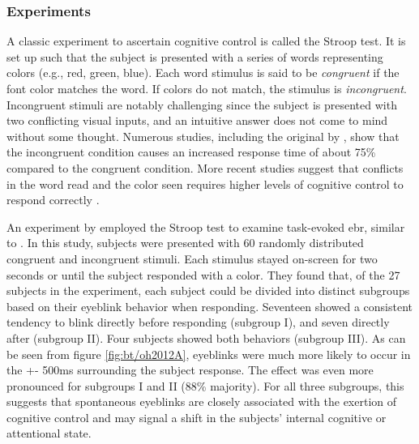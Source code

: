 
\subsubsection{Experiments}

A classic experiment to ascertain cognitive control is called the Stroop test. It is set up such that the subject is presented with a series of words representing colors (e.g., red, green, blue). Each word stimulus is said to be \textit{congruent} if the font color matches the word. If colors do not match, the stimulus is \textit{incongruent}. Incongruent stimuli are notably challenging since the subject is presented with two conflicting visual inputs, and an intuitive answer does not come to mind without some thought. Numerous studies, including the original by \textcite{stroop1935}, show that the incongruent condition causes an increased response time of about 75\% compared to the congruent condition. More recent studies suggest that conflicts in the word read and the color seen requires higher levels of cognitive control to respond correctly \cite{egner2005, bugg2012}. 

An experiment by \textcite{oh2012} employed the Stroop test to examine task-evoked \acrshort{ebr}, similar to \textcite{bochove2012}. In this study, subjects were presented with 60 randomly distributed congruent and incongruent stimuli. Each stimulus stayed on-screen for two seconds or until the subject responded with a color. They found that, of the 27 subjects in the experiment, each subject could be divided into distinct subgroups based on their eyeblink behavior when responding. Seventeen showed a consistent tendency to blink directly before responding (subgroup I), and seven directly after (subgroup II). Four subjects showed both behaviors (subgroup III). As can be seen from figure \ref{fig:bt/oh2012A}, eyeblinks were much more likely to occur in the +- 500ms surrounding the subject response. The effect was even more pronounced for subgroups I and II (88\% majority). For all three subgroups, this suggests that spontaneous eyeblinks are closely associated with the exertion of cognitive control and may signal a shift in the subjects' internal cognitive or attentional state.

